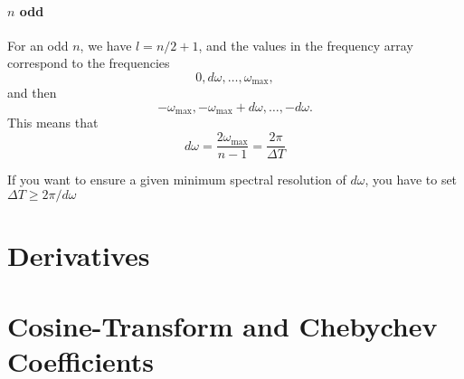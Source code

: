 \paragraph{$n$ odd}
For an odd $n$, we have $l=n/2 + 1$, and the values in the frequency array correspond
to the frequencies $$0, d\omega, \dots, \omega_{\max},$$ and then
$$-\omega_{\max}, -\omega_{\max}+d\omega, \dots, -d\omega.$$ This means that
\begin{equation}
  d\omega = \frac{2 \omega_{\max}}{n-1} = \frac{2\pi}{\Delta T}
\end{equation}

If you want to ensure a given minimum spectral resolution of $d\omega$, you
have to set $\Delta T \geq 2 \pi / d \omega$

\section{Derivatives}

\newpage
\section{Cosine-Transform and Chebychev Coefficients}

